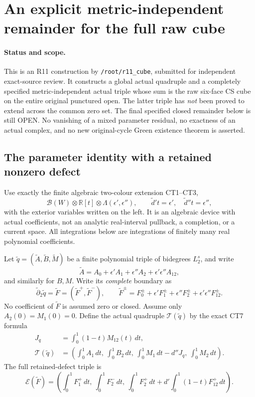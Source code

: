 \section{An explicit metric-independent remainder for the full raw cube}
\label{sec:r11-global-cube-remainder}

\paragraph{Status and scope.}
This is an R11 construction by \texttt{/root/r11\_cube}, submitted
for independent exact-source review.  It constructs a global actual
quadruple and a completely specified metric-independent actual triple
whose sum is the raw six-face CS cube on the entire original punctured
open.  The latter triple has \emph{not} been proved to extend across
the common zero set.  The final specified closed remainder below is
still OPEN.  No vanishing of a mixed parameter residual, no exactness
of an actual complex, and no new original-cycle Green existence theorem
is asserted.

\subsection{The parameter identity with a retained nonzero defect}

Use exactly the finite algebraic two-colour extension CT1--CT3,
\[
 \mathscr B(W)\otimes\mathbb R[t]\otimes
                       \Lambda(\epsilon',\epsilon''),
 \qquad \widetilde d't=\epsilon',\quad
 \widetilde d''t=\epsilon'',
 \tag{GR1}
\]
with the exterior variables written on the left.  It is an algebraic
device with actual coefficients, not an analytic real-interval
pullback, a completion, or a current space.  All integrations below
are integrations of finitely many real polynomial coefficients.

Let $\widetilde q=(\widetilde A,\widetilde B,\widetilde M)$ be a
finite polynomial triple of bidegrees $L_2^s$, and write
\[
 \widetilde A=A_0+\epsilon'A_1+\epsilon''A_2
                                      +\epsilon'\epsilon''A_{12},
 \tag{GR2}
\]
and similarly for $B,M$.  Write its \emph{complete} boundary as
\[
 \widetilde\partial_2\widetilde q=\widetilde F
                  =(\widetilde F^+,\widetilde F^-),\qquad
 \widetilde F^\pm=F_0^\pm+\epsilon'F_1^\pm
             +\epsilon''F_2^\pm+\epsilon'\epsilon''F_{12}^\pm.
 \tag{GR3}
\]
No coefficient of $\widetilde F$ is assumed zero or closed.
Assume only $A_2(0)=M_1(0)=0$.  Define the actual quadruple
$\mathcal T(\widetilde q)$ by the exact CT7 formula
\[
 \begin{split}
 J_q&=\int_0^1(1-t)M_{12}(t)\,dt,\\
 \mathcal T(\widetilde q)
  &=\left(\int_0^1A_1\,dt,\ \int_0^1B_2\,dt,\
          \int_0^1M_1\,dt-d''J_q,\ \int_0^1M_2\,dt\right).
 \end{split}
 \tag{GR4}
\]
The full retained-defect triple is
\[
 \mathcal E(\widetilde F)=
 \left(\int_0^1F_1^+\,dt,\ \int_0^1F_2^-\,dt,\
       \int_0^1F_2^+\,dt+d'\int_0^1(1-t)F_{12}^+\,dt\right).
 \tag{GR5}
\]

